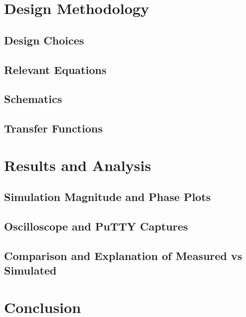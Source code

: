 \documentclass[conference]{IEEEtran}
\begin{document}
\section{Design Methodology}
    \subsection{Design Choices}
    \subsection{Relevant Equations}
    \subsection{Schematics}
    \subsection{Transfer Functions}

\section{Results and Analysis}
    \subsection{Simulation Magnitude and Phase Plots}
    \subsection{Oscilloscope and PuTTY Captures}
    \subsection{Comparison and Explanation of Measured vs Simulated}

\section{Conclusion}
\end{document}
